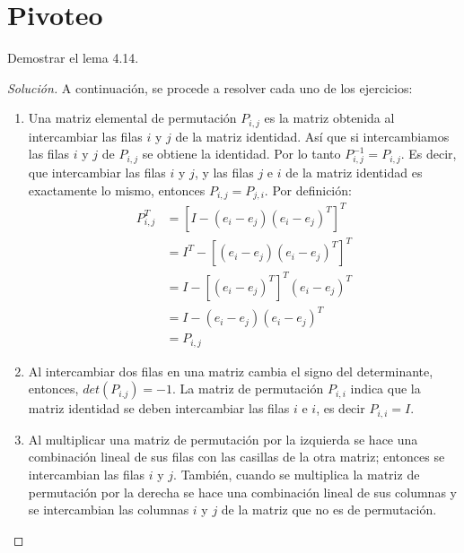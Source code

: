 \documentclass[12pt]{book}
\newenvironment{solucion}
  {\renewcommand\qedsymbol{$\square$}\begin{proof}[Solución]}
  {\end{proof}}
\begin{document}
\section{Pivoteo}
\eje Demostrar el lema 4.14.
\begin{solucion}
A continuación, se procede a resolver cada uno de los ejercicios:
\renewcommand{\labelenumii}{\roman{enumii}.}
\begin{enumerate}
    \item Una matriz elemental de permutación $P_{i,j}$ es la matriz obtenida al intercambiar las filas $i$ y $j$ de la matriz identidad. Así que si intercambiamos las filas $i$ y $j$ de $P_{i,j}$ se obtiene la identidad. Por lo tanto $P_{i,j}^{-1}=P_{i,j}$. Es decir, que intercambiar las filas $i$ y $j$, y las filas $j$ e $i$ de la matriz identidad es exactamente lo mismo, entonces $P_{i,j}=P_{j,i}$. Por definición:
    \begin{align*}
        P_{i,j}^T&=\left[I-(e_i-e_j)(e_i-e_j)^T\right]^T\\
        &=I^T-\left[(e_i-e_j)(e_i-e_j)^T\right]^T\\
        &=I-\left[(e_i-e_j)^T\right]^T(e_i-e_j)^T\\
        &=I-(e_i-e_j)(e_i-e_j)^T\\
        &=P_{i,j}
    \end{align*}
    \item Al intercambiar dos filas en una matriz cambia el signo del determinante, entonces, $det(P_{i.j})=-1$. La matriz de permutación $P_{i,i}$ indica que la matriz identidad se deben intercambiar las filas $i$ e $i$, es decir $P_{i,i}=I$.
    \item Al multiplicar una matriz de permutación por la izquierda se hace una combinación lineal de sus filas con las casillas de la otra matriz; entonces se intercambian las filas $i$ y $j$. También, cuando se multiplica la matriz de permutación por la derecha se hace una combinación lineal de sus columnas y se intercambian las columnas $i$ y $j$ de la matriz que no es de permutación.
\end{enumerate}
\end{solucion}
\end{document}
